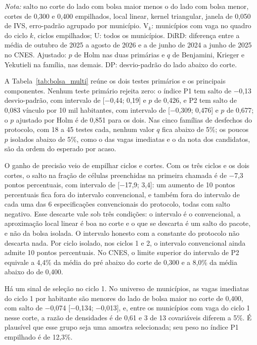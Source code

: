\documentclass[11pt,a4paper]{article}
\begin{document}
\begin{table}[htbp]
\vspace{2pt}
\begin{minipage}{0.94\textwidth}
\footnotesize \textit{Nota:} salto no corte do lado com bolsa maior menos o do
lado com bolsa menor, cortes de 0,300 e 0,400 empilhados, local linear, kernel
triangular, janela de 0,050 de IVS, erro-padrão agrupado por município. V$_k$:
municípios com vaga no quadro do ciclo $k$, ciclos empilhados; U: todos os
municípios. DiRD: diferença entre a média de outubro de 2025 a agosto de 2026 e
a de junho de 2024 a junho de 2025 no CNES. Ajustado: $p$ de Holm nas duas
primárias e $q$ de Benjamini, Krieger e Yekutieli na família, nas demais. DP:
desvio-padrão do lado abaixo do corte.
\end{minipage}
\end{table}

A Tabela~\ref{tab:bolsa_multi} reúne os dois testes primários e os principais
componentes. Nenhum teste primário rejeita zero: o índice P1 tem salto de
$-$0,13 desvio-padrão, com intervalo de [$-$0,44; 0,19] e $p$ de 0,426, e P2
tem salto de 0,083 vínculo por 10 mil habitantes, com intervalo de
[$-$0,309; 0,476] e $p$ de 0,677; o $p$ ajustado por Holm é de 0,851 para os
dois. Nas cinco famílias de desfechos do protocolo, com 18 a 45 testes cada,
nenhum valor $q$ fica abaixo de 5\%; os poucos $p$ isolados abaixo de 5\%,
como o das vagas imediatas e o da nota dos candidatos, são da ordem do esperado
por acaso.

O ganho de precisão veio de empilhar ciclos e cortes. Com os três ciclos e os
dois cortes, o salto na fração de células preenchidas na primeira chamada é de
$-$7,3 pontos percentuais, com intervalo de [$-$17,9; 3,4]: um aumento de 10
pontos percentuais fica fora do intervalo convencional, e também fora do
intervalo de cada uma das 6 especificações convencionais do protocolo, todas
com salto negativo. Esse descarte vale sob três condições: o intervalo é o
convencional, a aproximação local linear é boa no corte e o que se descarta é
um salto do pacote, e não da bolsa isolada. O intervalo honesto com a constante
do protocolo não descarta nada. Por ciclo isolado, nos ciclos 1 e 2, o
intervalo convencional ainda admite 10 pontos percentuais. No CNES, o limite
superior do intervalo de P2 equivale a 4,4\% da média do pré abaixo do corte de
0,300 e a 8,0\% da média abaixo do de 0,400.

Há um sinal de seleção no ciclo 1. No universo de municípios, as vagas
imediatas do ciclo 1 por habitante são menores do lado de bolsa maior no corte
de 0,400, com salto de $-$0,074 [$-$0,134; $-$0,013], e, entre os municípios
com vaga do ciclo 1 nesse corte, a razão de densidades é de 0,61 e 3 de 13
covariáveis diferem a 5\%. É plausível que esse grupo seja uma amostra
selecionada; seu peso no índice P1 empilhado é de 12,3\%.
\end{document}
